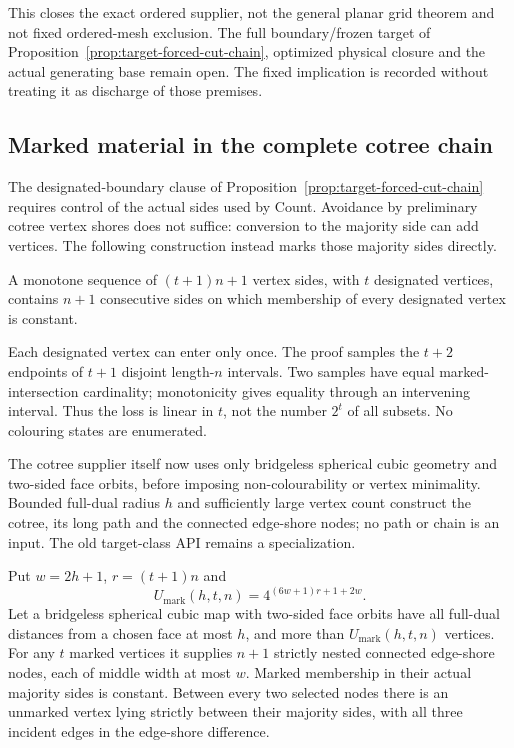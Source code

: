 This closes the exact ordered supplier, not the general planar grid
theorem and not fixed ordered-mesh exclusion.  The full boundary/frozen
target of Proposition~\ref{prop:target-forced-cut-chain}, optimized
physical closure and the actual generating base remain open.  The fixed
implication is recorded without treating it as discharge of those premises.

\subsection{Marked material in the complete cotree chain}
\label{sec:marked-cotree-material}

The designated-boundary clause of
Proposition~\ref{prop:target-forced-cut-chain} requires control of the
actual sides used by Count.  Avoidance by preliminary cotree vertex shores
does not suffice: conversion to the majority side can add vertices.
The following construction instead marks those majority sides directly.

\begin{lemma}
A monotone sequence of $(t+1)n+1$ vertex sides, with $t$ designated
vertices, contains $n+1$ consecutive sides on which membership of every
designated vertex is constant.
\end{lemma}

Each designated vertex can enter only once.  The proof samples the
$t+2$ endpoints of $t+1$ disjoint length-$n$ intervals.  Two samples
have equal marked-intersection cardinality; monotonicity gives equality
through an intervening interval.  Thus the loss is linear in $t$, not
the number $2^t$ of all subsets.  No colouring states are enumerated.

The cotree supplier itself now uses only bridgeless spherical cubic
geometry and two-sided face orbits, before imposing non-colourability
or vertex minimality.  Bounded full-dual radius $h$ and sufficiently
large vertex count construct the cotree, its long path and the connected
edge-shore nodes; no path or chain is an input.
The old target-class API remains a specialization.

\begin{theorem}
Put $w=2h+1$, $r=(t+1)n$ and
\[
 U_{\mathrm{mark}}(h,t,n)=4^{(6w+1)r+1+2w}.
\]
Let a bridgeless spherical cubic map with two-sided face orbits have
all full-dual distances from a chosen face at most $h$, and more than
$U_{\mathrm{mark}}(h,t,n)$ vertices.  For any $t$ marked vertices it
supplies $n+1$ strictly nested connected edge-shore nodes, each of
middle width at most $w$.  Marked membership in their actual majority
sides is constant.  Between every two selected nodes there is an
unmarked vertex lying strictly between their majority sides, with all
three incident edges in the edge-shore difference.
\end{theorem}

